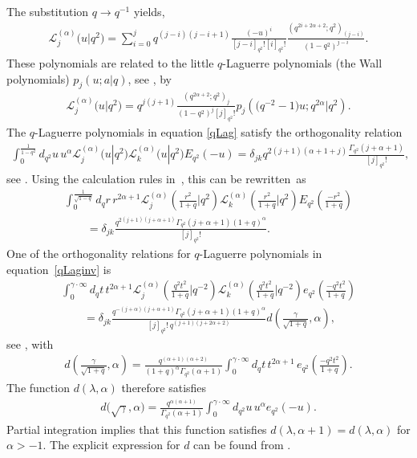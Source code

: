 \documentclass[11pt]{article}
\newcommand{\cL}{\mathcal{L}}
\numberwithin{equation}{section}
\begin{document}
The substitution $q\to q^{-1}$ yields,
\begin{gather}
\label{qLag}
\cL^{(\alpha)}_j\big(u|q^2\big) = \sum_{i=0}^jq^{(j-i)(j-i+1)}\frac{(-u)^i}{[j-i]_{q^2}![i]_{q^2}!}\frac{(q^{2i+2\alpha+2};q^2)_{(j-i)}}{(1-q^2)^{j-i}}.
\end{gather}
These polynomials are related to the little $q$-Laguerre polynomials (the Wall polynomials) $p_j(u;a|q)$, see \cite[Section~3.20]{Koekoek}, by
\begin{gather*}
\cL^{(\alpha)}_j\big(u|q^2\big) = q^{j(j+1)}\frac{(q^{2\alpha+2};q^2)_j}{(1-q^2)^j[j]_{q^2}!}p_j\left(\big(q^{-2}-1\big)u;q^{2\alpha}|q^2\right).
\end{gather*}
The $q$-Laguerre polynomials in equation \eqref{qLag} satisfy the orthogonality relation
\begin{gather*}
\int_0^{\frac{1}{1-q^2}}d_{q^2}u\,u^\alpha\cL_j^{(\alpha)}\big(u|q^2\big)\cL_k^{(\alpha)}\big(u|q^2\big)E_{q^2}(-u)=
\delta_{jk}q^{2(j+1)(\alpha+1+j)}\frac{\Gamma_{q^2}(j+\alpha+1)}{[j]_{q^2}!},
\end{gather*}
see \cite[equation (3.20.2)]{Koekoek}. Using the calculation rules in~\cite[Lemma 10]{MR2595267}, this can be rewritten~as
\begin{gather}
 \int_0^{\frac{1}{\sqrt{1-q}}}d_qr\, r^{2\alpha+1}\cL_j^{(\alpha)}\left(\frac{r^2}{1+q}|q^2\right)\cL_k^{(\alpha)}\left(\frac{r^2}{1+q}|q^2\right) E_{q^2}\left(\frac{-r^2}{1+q}\right)\nonumber\\
\qquad{} =\delta_{jk}\frac{q^{2(j+1)(j+\alpha+1)}\Gamma_{q^2}(j+\alpha+1)(1+q)^{\alpha}}{[j]_{q^2}!}.\label{orthLag1}
\end{gather}
One of the orthogonality relations for $q$-Laguerre polynomials in equation~\eqref{qLaginv} is
\begin{gather}
 \int_0^{\gamma\cdot\infty}d_qt\, t^{2\alpha+1}\cL_j^{(\alpha)}\left(\frac{q^2t^2}{1+q}|q^{-2}\right)\cL_k^{(\alpha)}\left(\frac{q^2t^2}{1+q}|q^{-2}\right)
 e_{q^2}\left(\frac{-q^2t^2}{1+q}\right)\nonumber\\
\qquad{} =\delta_{jk}\frac{q^{-(j+\alpha)(j+\alpha+1)}\Gamma_{q^2}(j+\alpha+1)
(1+q)^{\alpha}}{[j]_{q^2}!\,q^{(j+1)(j+2\alpha+2)}}d\left(\frac{\gamma}{\sqrt{1+q}},\alpha\right),\label{orthLag2}
\end{gather}
see \cite[equation~(3.21.3)]{Koekoek}, with
\begin{gather*}
d\left(\frac{\gamma}{\sqrt{1+q}},\alpha\right) = \frac{q^{(\alpha+1)(\alpha+2)}}{(1+q)^\alpha\Gamma_{q^2}(\alpha+1)}\int_0^{\gamma\cdot\infty}d_qt\, t^{2\alpha+1}\,e_{q^2}\left(\frac{-q^2t^2}{1+q}\right).
\end{gather*}
The function $d(\lambda,\alpha)$ therefore satisf\/ies
\begin{gather*}
d\big(\sqrt{\gamma},\alpha\big) = \frac{q^{\alpha(\alpha+1)}}{\Gamma_{q^2}(\alpha+1)}\int_0^{\gamma\cdot\infty}d_{q^2}u\,u^\alpha e_{q^2}(-u).
\end{gather*}
Partial integration implies that this function satisf\/ies $d(\lambda,\alpha+1)=d(\lambda,\alpha)$ for $\alpha>-1$. The explicit expression for $d$ can be found from \cite[equation~(3.21.3)]{Koekoek}.
\end{document}
